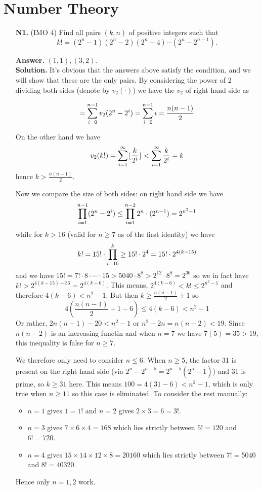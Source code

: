 \documentclass[11pt,a4paper]{article}
\begin{document}
\section*{Number Theory}
\begin{enumerate}
	\item [\textbf{N1.}] (IMO 4) Find all pairs $(k,n)$ of positive integers such that \[ k!=(2^n-1)(2^n-2)(2^n-4)\cdots(2^n-2^{n-1}). \]
	
	\textbf{Answer.} $(1, 1), (3, 2)$. \\
	\textbf{Solution.} It's obvious that the answers above satisfy the condition, and we will show that these are the only pairs. By considering the power of 2 dividing both sides (denote by $v_2(\cdot)$) we have the $v_2$ of right hand side as 
	
	\[=\displaystyle\sum_{i=0}^{n-1}v_2(2^n-2^i)=\displaystyle\sum_{i=0}^{n-1} i = \frac{n(n-1)}{2}\]
	
	On the other hand we have 
	\[
	v_2(k!)=\displaystyle\sum_{i=1}^{\infty}\lfloor \frac{k}{2^i}\rfloor
	< \displaystyle\sum_{i=1}^{\infty}\frac{k}{2^i}
	=k
	\]
	hence $k > \frac{n(n-1)}{2}$. 
	
	Now we compare the size of both sides: on right hand side we have 
	\[
	\displaystyle\prod_{i=1}^{n-1} (2^n-2^i) \le \displaystyle\prod_{i=1}^{n-2} 2^n \cdot (2^{n-1}) = 2^{n^2 - 1}
	\]
	while for $k > 16$ (valid for $n\ge 7$ as of the first identity) we have 
	\[
	k! = 15! \cdot \displaystyle\prod_{i=16}^k \ge 15!\cdot 2^4 = 15!\cdot 2^{4(k-15)}
	\]
	and we have $15!=7!\cdot 8\cdot\cdots\cdot 15 > 5040\cdot 8^8 > 2^12\cdot 8^8=2^36$ so we in fact have $k! > 2^{4(k-15) + 36} = 2^{4(k-6)}$. 
	This means, $2^{4(k-6)} < k! \le 2^{n^2 - 1}$ and therefore $4(k-6)< n^2-1$. 
	But then $k \ge \frac{n(n-1)}{2} + 1$ so 
	\[
	4(\frac{n(n-1)}{2} + 1 - 6) \le 4(k-6)< n^2-1
	\]
	Or rather, $2n(n-1)-20 < n^2-1$ or $n^2-2n = n(n-2) < 19$. Since $n(n-2)$ is an increasing functin and when $n=7$ we have $7(5)=35>19$, this inequality is false for $n\ge 7$. 
	
	We therefore only need to consider $n\le 6$. When $n\ge 5$, the factor 31 is present on the right hand side (via $2^n-2^{n-5}=2^{n-5}(2^5-1)$) and 31 is prime, so $k\ge 31$ here. This means 
	$100=4(31-6) < n^2-1$, which is only true when $n\ge 11$ so this case is eliminated. 
	To consider the rest manually: 
	\begin{itemize}
		\item $n=1$ gives $1=1!$ and $n=2$ gives $2\times 3=6=3!$. 
		\item $n=3$ gives $7\times 6\times 4=168$ which lies strictly between $5!=120$ and $6!=720$. 
		\item $n=4$ gives $15\times 14\times 12\times 8=20160$ which lies strictly between $7!=5040$ and $8!=40320$. 
	\end{itemize}
	Hence only $n=1, 2$ work. 
	

\end{enumerate}
\end{document}
